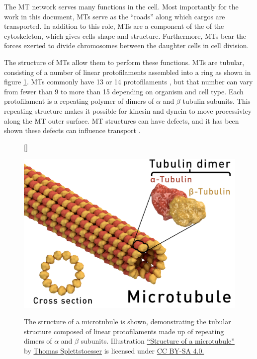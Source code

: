 The MT network serves many functions in the cell. Most importantly for the work in this document, MTs serve as the ``roads'' along which cargos are transported. In addition to this role, MTs are a component of the of the cytoskeleton, which gives cells shape and structure. Furthermore, MTs bear the forces exerted to divide chromosomes between the daughter cells in cell division. 

The structure of MTs allow them to perform these functions. MTs are tubular, consisting of a number of linear protofilaments assembled into a ring \cite{Grimstone1966} as shown in figure \ref{fig:MTstructure}. MTs commonly have 13 or 14 protofilaments \cite{Pierson1978}, but that number can vary from fewer than 9 to more than 15 depending on organism and cell type\cite{Davis1983}. Each protofilament is a repeating polymer of dimers of $\alpha$ and $\beta$ tubulin subunits. This repeating structure makes it possible for kinesin and dynein to move processivley along the MT outer surface. MT structures can have defects, and it has been shown these defects can influence transport \cite{Liang2016}.

\begin{figure}
[\FBwidth]
{\caption[Microtubule Structure]{The structure of a microtubule is shown, demonstrating the tubular structure composed of linear protofilaments made up of repeating dimers of $\alpha$ and $\beta$ subunits. Illustration \href{https://en.wikipedia.org/wiki/Microtubule\#/media/File:Microtubule_structure.png}{``Structure of a microtubule''} by \href{https://commons.wikimedia.org/wiki/User:Splette}{Thomas Splettstoesser} is licensed under \href{https://creativecommons.org/licenses/by-sa/4.0/}{CC BY-SA 4.0.}}
\label{fig:MTstructure}}
{\includegraphics[scale=.1]{background/Microtubule_structure}}
\end{figure}

